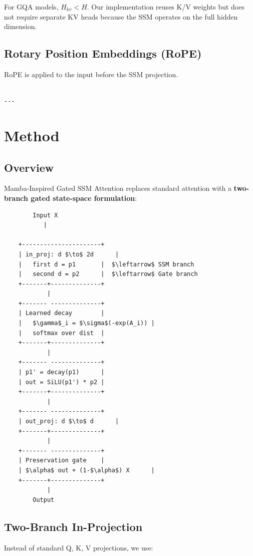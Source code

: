 For GQA models, $H_{kv} < H$. Our implementation reuses K/V weights but 
does not require separate KV heads because the SSM operates on the full 
hidden dimension.

\subsection{Rotary Position Embeddings (RoPE)}

RoPE is applied to the input before the SSM projection.
\begin{lstlisting}

---
\end{lstlisting}

\section{Method}

\subsection{Overview}

Mamba-Inspired Gated SSM Attention replaces standard attention with a 
\textbf{two-branch gated state-space formulation}:

\begin{lstlisting}
        Input X
           |
            
    +----------------------+
    | in_proj: d $\to$ 2d      |
    |   first d = p1       |  $\leftarrow$ SSM branch
    |   second d = p2      |  $\leftarrow$ Gate branch
    +-------+--------------+
            |
    +------- --------------+
    | Learned decay        |
    |   $\gamma$_i = $\sigma$(-exp(A_i)) |
    |   softmax over dist  |
    +-------+--------------+
            |
    +------- --------------+
    | p1' = decay(p1)      |
    | out = SiLU(p1') * p2 |
    +-------+--------------+
            |
    +------- --------------+
    | out_proj: d $\to$ d      |
    +-------+--------------+
            |
    +------- --------------+
    | Preservation gate    |
    | $\alpha$ out + (1-$\alpha$) X      |
    +-------+--------------+
            |
        Output
\end{lstlisting}

\subsection{Two-Branch In-Projection}

Instead of standard Q, K, V projections, we use:

